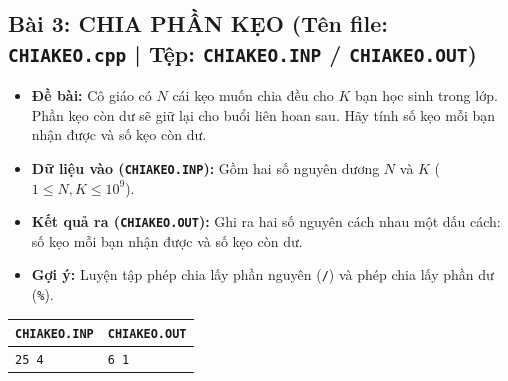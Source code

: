 \documentclass[11pt,a4paper]{article}
\begin{document}
\vspace{-2mm}
\subsection*{\color{AsianDarkBlue}\small Bài 3: CHIA PHẦN KẸO (Tên file: \texttt{CHIAKEO.cpp} | Tệp: \texttt{CHIAKEO.INP} / \texttt{CHIAKEO.OUT})}
\begin{itemize}
    \setlength{\itemsep}{0.5pt}
    \footnotesize
    \item \textbf{Đề bài:} Cô giáo có $N$ cái kẹo muốn chia đều cho $K$ bạn học sinh trong lớp. Phần kẹo còn dư sẽ giữ lại cho buổi liên hoan sau. Hãy tính số kẹo mỗi bạn nhận được và số kẹo còn dư.
    \item \textbf{Dữ liệu vào (\texttt{CHIAKEO.INP}):} Gồm hai số nguyên dương $N$ và $K$ ($1 \le N, K \le 10^9$).
    \item \textbf{Kết quả ra (\texttt{CHIAKEO.OUT}):} Ghi ra hai số nguyên cách nhau một dấu cách: số kẹo mỗi bạn nhận được và số kẹo còn dư.
    \item \textbf{Gợi ý:} Luyện tập phép chia lấy phần nguyên (\texttt{/}) và phép chia lấy phần dư (\texttt{\%}).
\end{itemize}
\vspace{-2mm}
\begin{center}
\footnotesize
\begin{tabular}{|p{7.8cm}|p{7.8cm}|}
\hline
\textbf{\texttt{CHIAKEO.INP}} & \textbf{\texttt{CHIAKEO.OUT}} \\
\hline
\texttt{25 4} & \texttt{6 1} \\
\hline
\end{tabular}
\end{center}

\newpage

\end{document}
